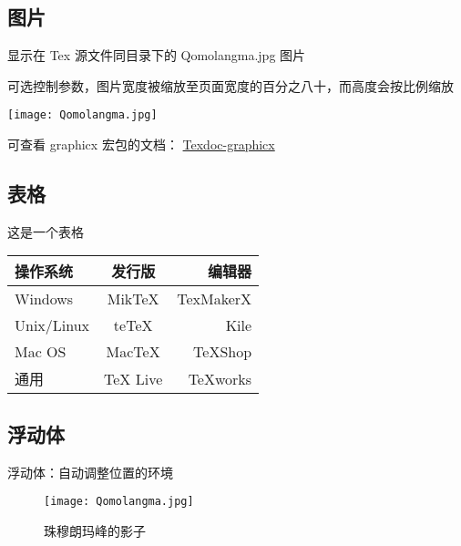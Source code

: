 \documentclass[UTF8]{ctexart}
\begin{document}
    \subsection{图片}
    显示在 Tex 源文件同目录下的 Qomolangma.jpg 图片
    
    可选控制参数，图片宽度被缩放至页面宽度的百分之八十，而高度会按比例缩放

    \texttt{[image: Qomolangma.jpg]}

    可查看 graphicx 宏包的文档： \href{https://texdoc.org/serve/graphicx.pdf/0}{Texdoc-graphicx}

    \subsection{表格}
    这是一个表格

    \begin{tabular}{|l|c|r|}
         \hline
        操作系统& 发行版& 编辑器\\
        \hline
        Windows & MikTeX & TexMakerX \\
        \hline
        Unix/Linux & teTeX & Kile \\
        \hline
        Mac OS & MacTeX & TeXShop \\
        \hline
        通用& TeX Live & TeXworks \\
        \hline
    \end{tabular}

    \subsection{浮动体}
    浮动体：自动调整位置的环境

    \begin{figure}[htbp]
        \centering
        \texttt{[image: Qomolangma.jpg]}
        \caption{珠穆朗玛峰的影子}
        \label{fig::Qomolangma}
    \end{figure}
\end{document}
